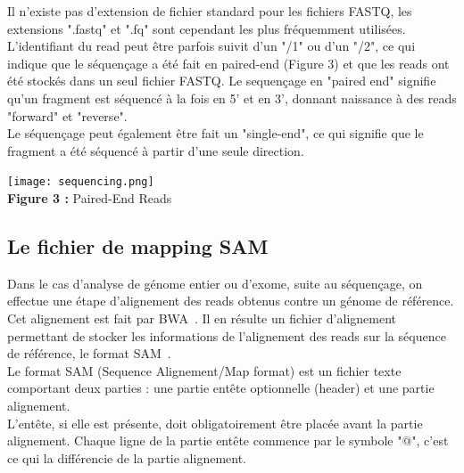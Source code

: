 \documentclass[a4paper,12pt]{article}
\begin{document}
Il n'existe pas d'extension de fichier standard pour les fichiers FASTQ, les extensions ".fastq" et ".fq" sont cependant les plus fréquemment utilisées. \\

L'identifiant du read peut être parfois suivit d'un "/1" ou d'un "/2", ce qui indique que le séquençage a été fait en paired-end (Figure 3) et que les reads ont été stockés dans un seul fichier FASTQ. Le sequençage en "paired end" signifie qu'un fragment est séquencé à la fois en 5' et en 3', donnant naissance à des reads "forward" et "reverse". \\
Le séquençage peut également être fait un "single-end", ce qui signifie que le fragment a été séquencé à partir d'une seule direction. 

\begin{center}
 \texttt{[image: sequencing.png]}~\\
\textbf{Figure 3 :} Paired-End Reads
\end{center}


\subsection{Le fichier de mapping SAM}

Dans le cas d'analyse de génome entier ou d'exome, suite au séquençage, on effectue une étape d'alignement des reads obtenus contre un génome de référence. Cet alignement est fait par BWA~\cite{BWA}. Il en résulte un fichier d'alignement permettant de stocker les informations de l'alignement des reads sur la séquence de référence, le format SAM~\cite{SAM}. \\

Le format SAM (Sequence Alignement/Map format) est un fichier texte comportant deux parties : une partie entête optionnelle (header) et une partie alignement.\\

L'entête, si elle est présente, doit obligatoirement être placée avant la partie alignement. Chaque ligne de la partie entête commence par le symbole "@", c'est ce qui la différencie de la partie alignement. \\
\end{document}
